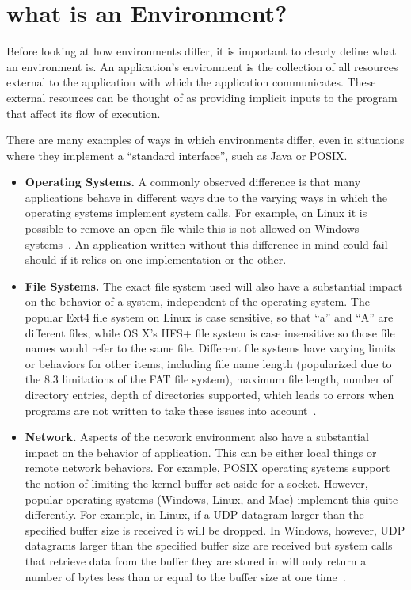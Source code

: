 \section{what is an Environment?}
\label{SEC:background}

Before looking at how environments differ, it is important to clearly
define what an environment is.  An application's environment is the
collection of all resources external to the application with which the
application communicates.  These external resources can be thought of as
providing implicit inputs to the program that affect its flow of execution.

There are many examples of ways in which environments differ, even in
situations where they implement a ``standard interface'', such as Java or
POSIX.

\begin{itemize}

\item {\bf Operating Systems.}  A commonly observed difference is that many
applications behave in different ways due to the varying ways in which the
operating systems implement system calls.  For example, on Linux it is
possible to remove an open file while this is not allowed on Windows
systems~\cite{UnlinkStandard}.  An application written without this
difference in mind could fail should if it relies on one implementation or
the other.

\item {\bf File Systems.}  The exact file system used will also have a
substantial impact on the behavior of a system, independent of the
operating system.  The popular Ext4 file system on Linux is case sensitive,
so that ``a'' and ``A'' are different files, while OS X's HFS+ file system
is case insensitive so those file names would refer to the same file.
Different file systems have varying limits or behaviors for other items,
including file name length (popularized due to the 8.3 limitations of the
FAT file system), maximum file length, number of directory entries, depth
of directories supported, which leads to errors when programs are not
written to take these issues into account~\cite{EXT4Layout, AppleHFS}.

\item {\bf Network.}  Aspects of the network environment also have a
substantial impact on the behavior of application.  This can be either
local things or remote network behaviors.  For example, POSIX operating
systems support the notion of limiting the kernel buffer set aside for a
socket.  However, popular operating systems (Windows, Linux, and Mac)
implement this quite differently.  For example, in Linux, if a UDP datagram
larger than the specified buffer size is received it will be dropped.  In
Windows, however, UDP datagrams larger than the specified buffer size are
received but system calls that retrieve data from the buffer they are
stored in will only return a number of bytes less than or equal to the
buffer size at one time~\cite{Zhuang_NSDI_2014}.


\end{itemize}
